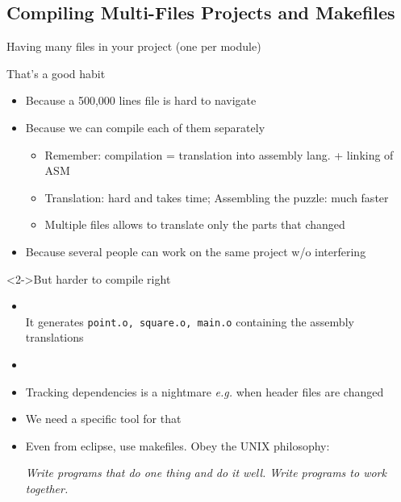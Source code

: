 \subsection{Compiling Multi-Files Projects and Makefiles}
\begin{frame}{Having many files in your project (one per module)}
  \begin{block}{That's a good habit}
    \begin{itemize}
    \item Because a 500,000 lines file is hard to navigate 
    \item Because  we can compile each of them separately
      \begin{itemize}
      \item Remember: compilation = translation into assembly lang. + linking of ASM
      \item Translation: hard and takes time; Assembling the puzzle: much faster
      \item Multiple files allows to translate only the parts that changed
      \end{itemize}
    \item Because several people can work on the same project w/o interfering
    \end{itemize}
  \end{block}\vspace{-.5\baselineskip}
  \begin{block}<2->{But harder to compile right}
    \begin{itemize}
    \item {} 
      \\[2pt]
      {\small It generates \texttt{point.o, square.o, main.o} containing the
        assembly translations}
    \item {} 
    \item Tracking dependencies is a nightmare \textit{e.g.} when header files
      are changed
    \item We need a specific tool for that
    \item<3> Even from eclipse, use makefiles. Obey the UNIX philosophy:

      \smallskip \centerline{\it Write programs that do one thing and do it
        well. Write programs to work together.}
  \end{itemize}
  \end{block}
\end{frame}


